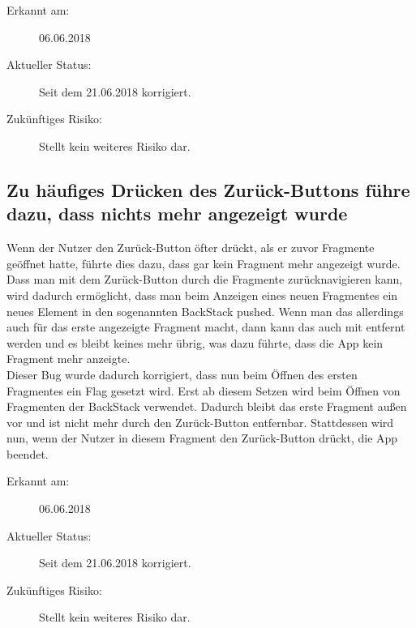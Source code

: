 \documentclass[12pt,a4paper,ngerman,enabledeprecatedfontcommands]{scrreprt}
\begin{document}
\begin{description}

    \item[Erkannt am:] 06.06.2018
    
    \item[Aktueller Status:] Seit dem 21.06.2018 korrigiert.
    
    \item[Zukünftiges Risiko:] Stellt kein weiteres Risiko dar.
    
\end{description}
\smallskip

\subsection{Zu häufiges Drücken des Zurück-Buttons führe dazu, dass nichts mehr angezeigt wurde}
Wenn der \gls{Nutzer} den Zurück-Button öfter drückt, als er zuvor Fragmente geöffnet hatte, führte dies dazu, dass gar kein Fragment mehr angezeigt wurde. Dass man mit dem Zurück-Button durch die Fragmente zurücknavigieren kann, wird dadurch ermöglicht, dass man beim Anzeigen eines neuen Fragmentes ein neues Element in den sogenannten \glqq{}BackStack\grqq{} pushed. Wenn man das allerdings auch für das erste angezeigte Fragment macht, dann kann das auch mit entfernt werden und es bleibt keines mehr übrig, was dazu führte, dass die \gls{App} kein Fragment mehr anzeigte.\\
Dieser Bug wurde dadurch korrigiert, dass nun beim Öffnen des ersten Fragmentes ein Flag gesetzt wird. Erst ab diesem Setzen wird beim Öffnen von Fragmenten der BackStack verwendet. Dadurch bleibt das erste Fragment außen vor und ist nicht mehr durch den Zurück-Button entfernbar. Stattdessen wird nun, wenn der \gls{Nutzer} in diesem Fragment den Zurück-Button drückt, die App beendet.

\begin{description}

    \item[Erkannt am:] 06.06.2018
    
    \item[Aktueller Status:] Seit dem 21.06.2018 korrigiert.
    
    \item[Zukünftiges Risiko:] Stellt kein weiteres Risiko dar.
    
\end{description}
\smallskip
\end{document}
